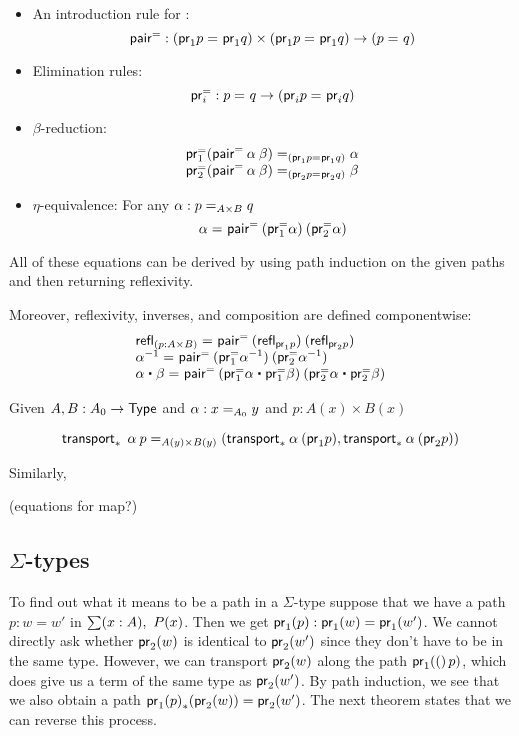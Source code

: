 \begin{itemize}
\item An introduction rule for :
  \[
  \pairpath : (\id{\proj{1} p}{\proj{1} q}) \times (\id{\proj{1} p}{\proj{1} q}) \to {(\id p q)}
  \]
\item Elimination rules:
  \[
  \projpath{i} : \id{p}{q} \to (\id{\proj{i} p}{\proj{i} q})
  \]
\item $\beta$-reduction:
  \[
  \begin{array}{l}
  \id[(\id{\proj{1} p}{\proj{1} q})]
       {\projpath{1}{(\pairpath \: \alpha \: \beta})}
       {\alpha} \\
  \id[(\id{\proj{2} p}{\proj{2} q})]
       {\projpath{2}{(\pairpath \: \alpha \: \beta})}
       {\beta}
  \end{array}
  \]
\item $\eta$-equivalence: For any $\alpha : \id[A \times B] p q$
  \[
  \id{\alpha}{\pairpath \: (\projpath{1} \alpha) \: (\projpath{2} \alpha) }
  \]
\end{itemize}
All of these equations can be derived by using path induction on the given
paths and then returning reflexivity.  

Moreover, reflexivity, inverses, and composition are defined
componentwise:
\[
\begin{array}{l}
\id {\refl{(p : A \times B)}} {\pairpath \: (\refl{\proj{1} p}) \: (\refl{\proj{2} p})} \\
\id {\opp{\alpha}} {\pairpath \: (\opp{\projpath{1} \alpha}) \: (\opp{\projpath{2} \alpha})}  \\
\id {{\alpha \ct \beta}} {\pairpath \: 
  ({\projpath{1} \alpha} \ct
   {\projpath{1} \beta})
   \: 
   ({\projpath{2} \alpha} \ct {\projpath{2} \beta})}
\end{array}
\]

Given $ A, B : A_0 \to \type$ and $\alpha : \id[A_0]{x}{y}$ 
and $p : A(x) \times B(x)$

\[
\id[A(y) \times B(y)]{\transport{x_0:A_0 \mapsto A(x_0) \times B(x_0)}
  \: \alpha \: {p}}
   {(\transport{x_0 \mapsto A(x_0)} \alpha \: (\proj{1} p), 
       \transport{x_0 \mapsto B(x_0)} \alpha \: (\proj{2} p))}
\]

Similarly, 

(equations for map?)

\subsection{$\Sigma$-types}
To find out what it means to be a path in a $\Sigma$-type suppose that we have a path $p:w=w'$ in $\sm{x:A}P(x)$. Then we get $\ap{\proj{1}}{p}:\proj{1}(w)=\proj{1}(w')$. We cannot directly ask whether $\proj{2}(w)$ is identical to $\proj{2}(w')$ since they don't have to be in the same type. However, we can transport $\proj{2}(w)$ along the path $\ap{\proj{1}}(p)$, which does give us a term of the same type as $\proj{2}(w')$. By path induction, we see that we also obtain a path $\trans{\ap{\proj{1}}{p}}{\proj{2}(w)}=\proj{2}(w')$. The next theorem states that we can reverse this process.

